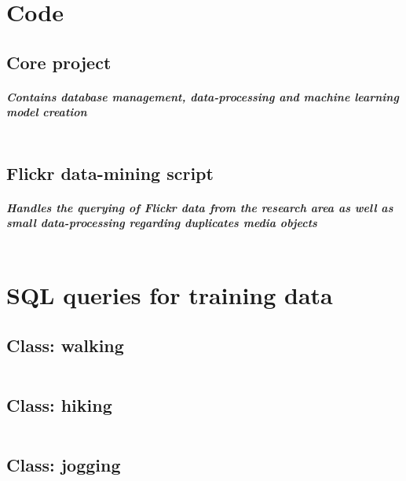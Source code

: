 \appendix

\chapter{Code} \label{python_code}

\section{Core project}
\paragraph*{Contains database management, data-processing and machine learning model creation}
\inputminted[linenos, fontsize=\tiny]{python}{code/fusion_file_appendix.py}
\clearpage

\section{Flickr data-mining script}
\paragraph*{Handles the querying of Flickr data from the research area as well as small data-processing regarding duplicates media objects}
\inputminted[linenos, fontsize=\tiny]{python}{code/flickr_mining_Kt_Zug_Appendix.py}
\clearpage


\chapter{SQL queries for training data} \label{sql_queries_for_trainingdata}

\section{Class: walking}

\inputminted[linenos]{sql}{code/walking.txt}
\clearpage

\section{Class: hiking}

\inputminted[linenos]{sql}{code/hiking.txt}
\clearpage

\section{Class: jogging}

